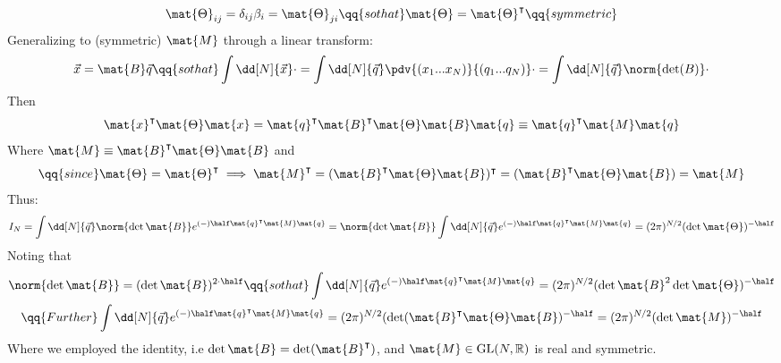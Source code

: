 $$
    \mat {\Theta} _{ij}
=
    \delta _{ij} \beta _{i}
=
    \mat {\Theta} _{ji}
\qq{so that} 
    \mat {\Theta} 
=
    \mat {\Theta} ^{\intercal} 
\qq
{symmetric} 
$$
Generalizing to 
(symmetric) $\mat{M}$ 
through a linear transform:
$$
    \vec{x} 
=
    \mat{B} 
    \vec{q} 
\qq{so that} 
    \int  \dd[N] {\vec{x}}  \cdot 
=
    \int \dd[N] {\vec{q}} 
    \pdv 
    {(x_{1} ... x_{N})} 
    {(q_{1} ... q_{N})} 
    \cdot 
=
    \int \dd[N] {\vec{q}}  
    \norm{\det (B)} 
    \cdot 
$$ 
Then 
$$
    \mat{x} ^{\intercal} 
    \mat{\Theta} 
    \mat{x} 
=
    \mat{q} ^{\intercal} 
    \mat{B} ^{\intercal} 
    \mat{\Theta} 
    \mat{B} \mat{q} 
\equiv
    \mat{q} ^{\intercal} 
    \mat{M} 
    \mat{q}
$$
Where 
$\mat{M} 
    \equiv 
\mat{B} ^{\intercal} 
\mat{\Theta} 
\mat{B} $
and
$$ \qq{since}
    \mat {\Theta} 
=
    \mat {\Theta} ^{\intercal} 
\implies 
    \mat{M} ^{\intercal} 
=
    ( \mat{B} ^{\intercal} 
    \mat{\Theta} 
    \mat{B} )  
    ^{\intercal}
=
    ( \mat{B} ^{\intercal} 
    \mat{\Theta} 
    \mat{B} )  
=
    \mat{M}
$$  
Thus:
\begin{align*}
    I _{N} 
=
    \int \dd[N] {\vec{q}}
    \norm { \det \mat{B} }
    e^
    {
    (-) \half 
    \mat{q} ^{\intercal} 
    \mat{M} 
    \mat{q} 
    }
=
\norm { \det \mat{B} }
    \int \dd[N] {\vec{q}}
    e^
    {
    (-) \half 
    \mat{q} ^{\intercal} 
    \mat{M} 
    \mat{q} 
    }
=
    ( 2\pi ) ^{N/2} 
    (\det \mat{\Theta} )
    ^{- \half}
\end{align*}   
Noting that 
\begin{gather*}
    \norm { \det \mat{B} }
=
    (\det \mat{B}) ^{2 \cdot \half}
\qq{so that}  
    \int \dd[N] {\vec{q}} 
    e^{(-) \half 
    \mat{q}^{\intercal} 
    \mat{M} \mat{q} }
=
    (2 \pi) ^{N/2}
    ( \det \mat{B} ^{2} 
    \det \mat{\Theta}) 
    ^{- \half}
\\
    \qq 
    {Further}  
    \int \dd[N] {\vec{q}} 
    e^{(-) \half 
    \mat{q}^{\intercal} 
    \mat{M} \mat{q} }
=
    (2\pi) ^{N/2}
    (\det (\mat{B}^{\intercal} 
    \mat {\Theta} 
    \mat {B}) ^{- \half}
=
    (2\pi) ^{N/2}
    (\det \mat{M})
    ^{- \half}
\end{gather*}
Where we employed 
the identity, i.e
$
    \det \mat{B}
= 
    \det (\mat{B} ^{\intercal})
$,
and 
$ \mat{M} \in 
\text{GL} (N,\mathbb{R})$ 
is real and symmetric.

